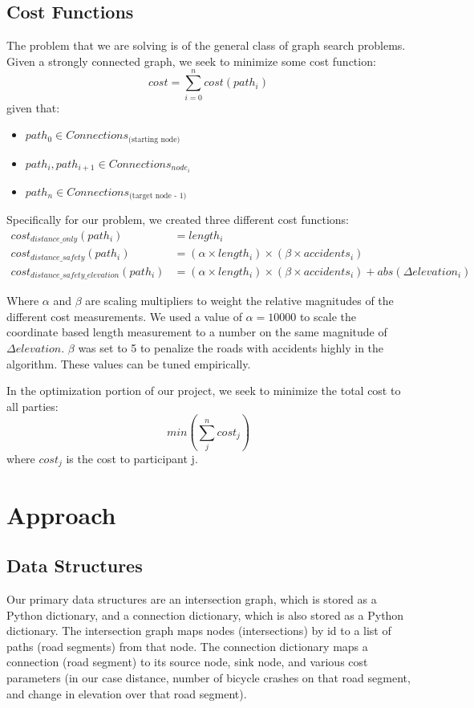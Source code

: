 \documentclass[11pt]{article}
\begin{document}
\subsection{Cost Functions}
The problem that we are solving is of the general class of graph search problems. Given a strongly connected graph, we seek to minimize some cost function:
\begin{equation}
cost = \sum_{i=0}^n cost(path_i)
\end{equation}
given that:
\begin{itemize}
\item $path_0 \in Connections_{\text{(starting node)}}$
\item $path_i, path_{i+1} \in Connections_{node_i}$
\item $path_n \in Connections_{\text{(target node - 1)}}$
\end{itemize}

\noindent Specifically for our problem, we created three different cost functions:
\begin{align}\label{cost_fns}
cost_{distance\_only}(path_i) &= length_i \\
cost_{distance\_safety}(path_i) &= (\alpha \times length_i) \times  (\beta \times accidents_i) \\
cost_{distance\_safety\_elevation}(path_i) &= (\alpha \times length_i) \times  (\beta \times accidents_i) + abs(\Delta elevation_i)
\end{align}


\noindent Where $\alpha$ and $\beta$ are scaling multipliers to weight the relative magnitudes of the different cost measurements. We used a value of $\alpha = 10000$ to scale the coordinate based length measurement to a number on the same magnitude of $\Delta elevation$. $\beta$ was set to 5 to penalize the roads with accidents highly in the algorithm. These values can be tuned empirically.\par
\noindent In the optimization portion of our project, we seek to minimize the total cost to all parties:
\begin{equation}
min(\sum_j^n cost_j)
\end{equation}
where $cost_j$ is the cost to participant j.

\section{Approach}
\subsection{Data Structures}
Our primary data structures are an intersection graph, which is stored as a Python dictionary, and a connection dictionary, which is also stored as a Python dictionary. The intersection graph maps nodes (intersections) by id to a list of paths (road segments) from that node. The connection dictionary maps a connection (road segment) to its source node, sink node, and various cost parameters (in our case distance, number of bicycle crashes on that road segment, and change in elevation over that road segment).
\end{document}
